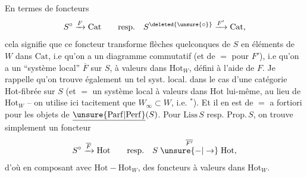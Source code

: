 En termes de foncteurs
\[
S^\circ\xrightarrow{F}\mathrm{Cat}\qquad\text{resp.}\quad S^{\deleted{\unsure{\circ}}}\xrightarrow{F'}\mathrm{Cat},
\]
cela signifie que ce foncteur transforme
flèches quelconques de $S$ en éléments de
$W$ dans $\mathrm{Cat}$,  i.e qu'on a un diagramme
commutatif
(et de $=$ pour $F'$), i.e qu'on a un ``système
local'' $\overline F$ sur $S$, à valeurs dans $\mathrm{Hot}_W$, défini à
l'aide de $F$. Je rappelle qu'on trouve également
un tel syst. local. dans le cas d'une catégorie
Hot-fibrée sur $S$ (et $=$ un système local
à valeurs dans $\mathrm{Hot}$ \unsure{\}} lui-même, au lieu de
$\mathrm{Hot}_W$ \unsure{\}} -- on utilise ici tacitement que
$W_\infty\subset W$, i.e. $^*$).
Et il en est de $=$ a fortiori pour les objets de
$\underline{\unsure{\mathrm{Parf}|\mathrm{Perf}}}(S)$. Pour $\mathrm{Liss}\,S$ resp. $\mathrm{Prop}.\,S$, on
trouve simplement un foncteur
\[
S^\circ\xrightarrow{\overline F}\mathrm{Hot}\qquad\text{resp.}\quad S\mathrel{\overset{\overline{F'}}{\unsure{-|\to}}}\mathrm{Hot},
\]
d'où en composant avec $\mathrm{Hot}\mathrel{-}\mathrm{Hot}_W$, des
foncteurs à valeurs dans $\mathrm{Hot}_W$.

